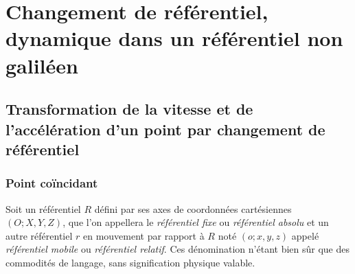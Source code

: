 \chapter{Changement de référentiel, dynamique dans un référentiel non galiléen}
\section{Transformation de la vitesse et de l'accélération d'un point par
changement de référentiel}
\subsection{Point coïncidant}
Soit un référentiel \(R\) défini par ses axes de coordonnées cartésiennes \((O;
X, Y, Z)\), que l'on appellera le \emph{référentiel fixe} ou \emph{référentiel
absolu} et un autre référentiel \(r\) en mouvement par rapport à \(R\) noté
\((o; x, y, z)\) appelé \emph{référentiel mobile} ou \emph{référentiel 
relatif}. Ces dénomination n'étant bien sûr que des commodités de langage, sans
signification physique valable.
